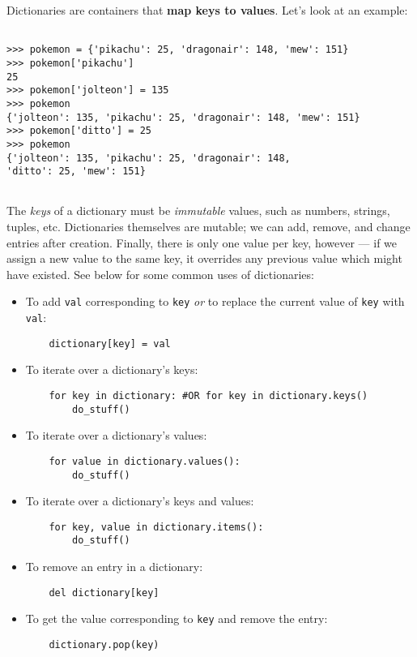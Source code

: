 
Dictionaries are containers that \textbf{map keys to values}.
Let's look at an example:

\begin{lstlisting}

>>> pokemon = {'pikachu': 25, 'dragonair': 148, 'mew': 151}
>>> pokemon['pikachu']
25
>>> pokemon['jolteon'] = 135
>>> pokemon
{'jolteon': 135, 'pikachu': 25, 'dragonair': 148, 'mew': 151}
>>> pokemon['ditto'] = 25
>>> pokemon
{'jolteon': 135, 'pikachu': 25, 'dragonair': 148,
'ditto': 25, 'mew': 151}


\end{lstlisting}
\vspace{5}
The {\it keys} of a dictionary must be {\it immutable} values, such as
numbers, strings, tuples, etc.
Dictionaries themselves are mutable; we can add,
remove, and change entries after creation. Finally, there is only one value per key,
however --- if we assign a new value to the same key, it overrides any previous
value which might have existed. See below for some common uses of dictionaries:

\begin{itemize}
\item To add {\tt val} corresponding to {\tt key} {\it or} to replace the current value of {\tt key} with {\tt val}:
\begin{lstlisting}
    dictionary[key] = val
\end{lstlisting}
\item To iterate over a dictionary's keys:
\begin{lstlisting}
    for key in dictionary: #OR for key in dictionary.keys()
        do_stuff()
\end{lstlisting}
\item To iterate over a dictionary's values:
\begin{lstlisting}
    for value in dictionary.values():
        do_stuff()
\end{lstlisting}
\item To iterate over a dictionary's keys and values:
\begin{lstlisting}
    for key, value in dictionary.items():
        do_stuff()
\end{lstlisting}
\item To remove an entry in a dictionary:
\begin{lstlisting}
    del dictionary[key]
\end{lstlisting}
\item To get the value corresponding to {\tt key} and remove the entry:
\begin{lstlisting}
    dictionary.pop(key)
\end{lstlisting} 
\end{itemize}

